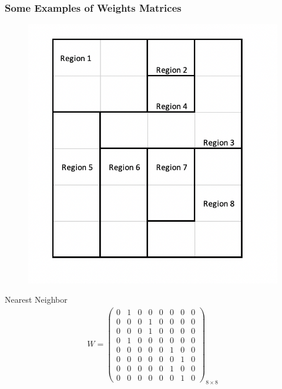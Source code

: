 \documentclass[
  shownotes,
  xcolor={svgnames},
  hyperref={colorlinks,citecolor=DarkBlue,linkcolor=DarkRed,urlcolor=DarkBlue}
   , aspectratio=169]{beamer}
\begin{document}
\begin{frame}[fragile]
\frametitle{Some Examples of Weights Matrices}


\begin{minipage}[t]{0.53\linewidth}
  \begin{figure}[H] \centering
    \captionsetup{justification=centering}
    \includegraphics[scale=0.6]{figures/regions_example}
   \end{figure}
  
    \end{minipage}
    \hfill
\begin{minipage}[t]{0.43\linewidth}%
\scriptsize
Nearest Neighbor
\begin{align}
W=\left(\begin{array}{cccccccc}
0 & 1 & 0 & 0 & 0 & 0 & 0 & 0\\
0 & 0 & 0 & 1 & 0 & 0 & 0 & 0\\
0 & 0 & 0 & 1 & 0 & 0 & 0 & 0\\
0 & 1 & 0 & 0 & 0 & 0 & 0 & 0\\
0 & 0 & 0 & 0 & 0 & 1 & 0 & 0\\
0 & 0 & 0 & 0 & 0 & 0 & 1 & 0\\
0 & 0 & 0 & 0 & 0 & 1 & 0 & 0\\
0 & 0 & 0 & 0 & 0 & 0 & 1 & 0
\end{array}\right)_{8\times8} \nonumber
\end{align}
\end{minipage}


\end{frame}
\end{document}

